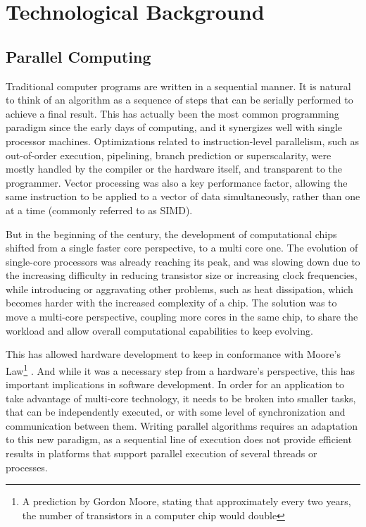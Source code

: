 \documentclass[main.tex]{subfiles}
\begin{document}
\chapter{Technological Background} \label{chapter:back}


\section{Parallel Computing}

Traditional computer programs are written in a sequential manner. It is natural to think of an algorithm as a sequence of steps that can be serially performed to achieve a final result. This has actually been the most common programming paradigm since the early days of computing, and it synergizes well with single processor machines. Optimizations related to instruction-level parallelism, such as out-of-order execution, pipelining, branch prediction or superscalarity, were mostly handled by the compiler or the hardware itself, and transparent to the programmer. Vector processing was also a key performance factor, allowing the same instruction to be applied to a vector of data simultaneously, rather than one at a time (commonly referred to as \ac{SIMD}).

But in the beginning of the  century, the development of computational chips shifted from a single faster core perspective, to a multi core one. The evolution of single-core processors was already reaching its peak, and was slowing down due to the increasing difficulty in reducing transistor size or increasing clock frequencies, while introducing or aggravating other problems, such as heat dissipation, which becomes harder with the increased complexity of a chip. The solution was to move a multi-core perspective, coupling more cores in the same chip, to share the workload and allow overall computational capabilities to keep evolving.

This has allowed hardware development to keep in conformance with Moore's Law\footnote{A prediction by Gordon Moore, stating that approximately every two years, the number of transistors in a computer chip would double} \cite{schaller1997moore}. And while it was a necessary step from a hardware's perspective, this has important implications in software development. In order for an application to take advantage of multi-core technology, it needs to be broken into smaller tasks, that can be independently executed, or with some level of synchronization and communication between them. Writing parallel algorithms requires an adaptation to this new paradigm, as a sequential line of execution does not provide efficient results in platforms that support parallel execution of several threads or processes.
\end{document}
